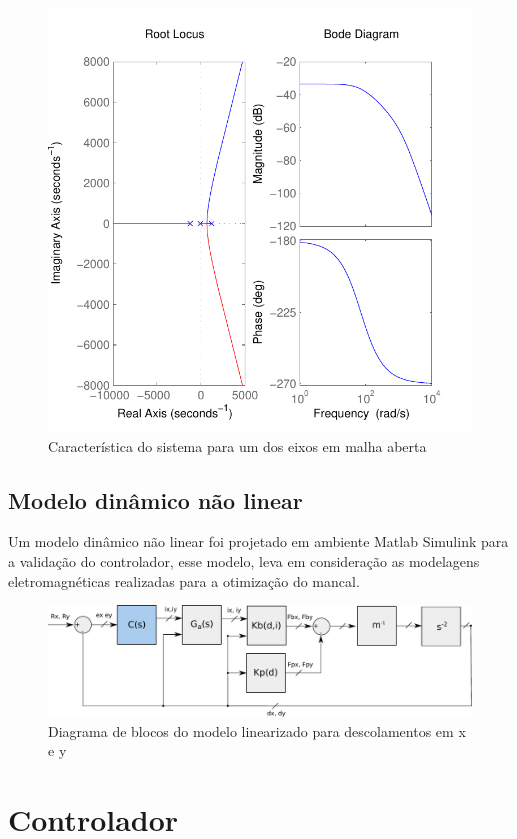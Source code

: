 \begin{figure}[th!]
\centering
\includegraphics[width=0.7\linewidth]{./Figs/Modelagem/bode_rlocus_pnt_operacao}
\caption{Característica do sistema para um dos eixos em malha aberta}
\label{fig:bode:rlocus:pnt:operacao}
\end{figure}

\subsection{Modelo dinâmico não linear}

Um modelo dinâmico não linear foi projetado em ambiente Matlab Simulink para a validação do controlador, esse modelo, leva em consideração as modelagens eletromagnéticas realizadas para a otimização do mancal.


\begin{figure}[th!]
	\centering
	\includegraphics[width=1\linewidth]{../Figs/Modelagem/diagrama_blocos_modelo_linear}
	\caption{Diagrama de blocos do modelo linearizado para descolamentos em x e y}
	\label{fig:diagrama:blocos:modelo:linear}
\end{figure}

\section{Controlador}

